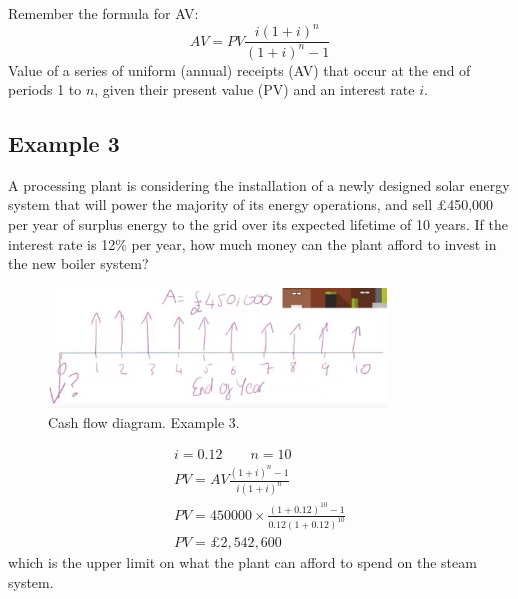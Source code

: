 Remember the formula for AV:
\begin{equation}
    AV = PV \frac{i\left(1 + i\right)^n}{\left(1+i\right)^n - 1}
\end{equation}
Value of a series of uniform (annual) receipts (AV) that occur at the end of periods 1 to $n$, given their present value (PV) and an interest rate $i$.
\subsection{Example 3}
A processing plant is considering the installation of a newly designed solar energy system that will power the majority of its energy operations, and sell \pounds 450,000 per year of surplus energy to the grid over its expected lifetime of 10 years. If the interest rate is 12\% per year, how much money can the plant afford to invest in the new boiler system?
\begin{figure}[H]
    \centering
    \includegraphics[width = 0.8\textwidth]{img/figure56.png}
    \caption{Cash flow diagram. Example 3.}
\end{figure}
\begin{gather}
    i = 0.12 \qquad n = 10\\
    PV = AV \frac{\left(1 + i\right)^n - 1}{i\left(1+i\right)^n}\\
    PV = 450000\times \frac{\left(1 + 0.12\right)^{10} - 1}{0.12\left(1+ 0.12\right)^{10}}\\
    PV = \pounds 2,542,600
\end{gather}
which is the upper limit on what the plant can afford to spend on the steam system.
